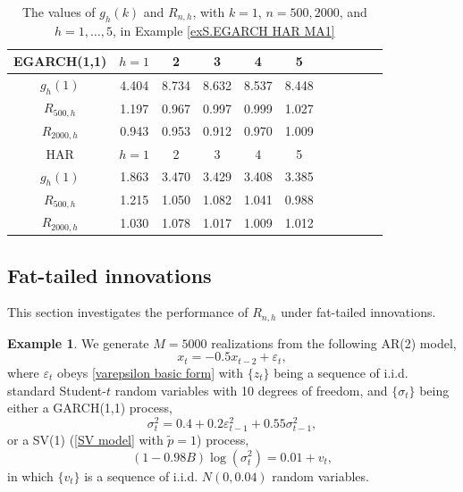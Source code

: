 \documentclass[ejsv2]{imsart}
\theoremstyle{plain}
\theoremstyle{definition}
\newtheorem{example}{Example}[section]
\theoremstyle{remark}
\begin{document}
\begin{table}
\caption{The values of $g_{h}(k)$ and $R_{n,h}$, with $k=1$, $n=500, 2000$, and $h=1,\ldots, 5$, in Example \ref{exS.EGARCH HAR MA1}}
\label{tab:exS.EGARCH HAR MA1}
\centering
\begin{tabular}{ccccccccccc} \hline
    EGARCH(1,1) & $h=1$ & 2 & 3 & 4 & 5 \\ \hline
    $g_{h}(1)$ & 4.404 & 8.734 & 8.632 & 8.537 & 8.448 \\ \hline
   $R_{500,h}$ & 1.197 & 0.967 & 0.997 & 0.999 & 1.027 \\
   $R_{2000,h}$ & 0.943 & 0.953 & 0.912 & 0.970 & 1.009 \\ \hline \hline
   HAR & $h=1$ & 2 & 3 & 4 & 5 \\ \hline
    $g_{h}(1)$ & 1.863 & 3.470 & 3.429 & 3.408 & 3.385 \\ \hline
   $R_{500,h}$ & 1.215 & 1.050 & 1.082 & 1.041 & 0.988 \\
   $R_{2000,h}$ & 1.030 & 1.078 & 1.017 & 1.009 & 1.012 \\ \hline
  \end{tabular}
\end{table}

\subsection{Fat-tailed innovations}\label{sec:heavy tail errors}
This section investigates the performance of $R_{n,h}$ under fat-tailed innovations.

\begin{example}\label{exS.heavy tail}
We generate $M=5000$ realizations from the following AR(2) model,
\begin{equation}\label{exS.heavy tail.1}
x_t=-0.5 x_{t-2}+\varepsilon_t,
\end{equation}
where 
$\varepsilon_t$ obeys
\eqref{varepsilon basic form} with $\{z_t\}$ being a sequence of
i.i.d. standard Student-$t$ random variables with 10 degrees of freedom, 
and $\{\sigma_t\}$ being either a GARCH(1,1) process,
\begin{equation}\label{exS.heavy tail.2}
\sigma_t^2=0.4+0.2\varepsilon_{t-1}^2+0.55\sigma_{t-1}^2,
\end{equation}
or a SV(1) (\eqref{SV model} with $\tilde{p}=1$) process,
\begin{equation}\label{exS.heavy tail.SV}
(1-0.98B)\log(\sigma_t^2)=0.01+v_t,
\end{equation}
in which
$\{v_t\}$ is a sequence of i.i.d. $N(0,0.04)$ random variables.
\end{example}
\end{document}
